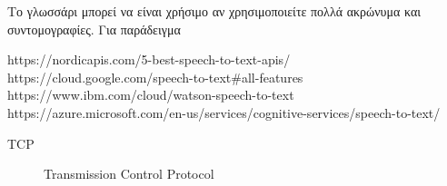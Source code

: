 \documentclass[oneside, 12pt]{book}
\begin{document}
%
\begin{Glossary}
Το γλωσσάρι μπορεί να είναι χρήσιμο αν χρησιμοποιείτε πολλά ακρώνυμα
και συντομογραφίες. Για παράδειγμα

https://nordicapis.com/5-best-speech-to-text-apis/
\newline
https://cloud.google.com/speech-to-text\#all-features
\newline
https://www.ibm.com/cloud/watson-speech-to-text
\newline
https://azure.microsoft.com/en-us/services/cognitive-services/speech-to-text/
\begin{description}
\item[TCP]Transmission Control Protocol
\end{description}
\end{Glossary}

\printbibliography
\lastpageinfo
\end{document}
